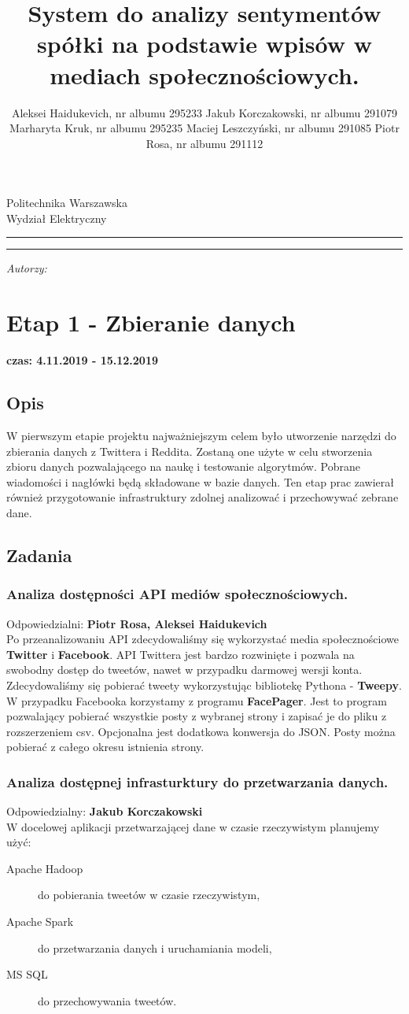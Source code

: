 \documentclass[a4paper,11pt, notitlepage ]{article}
\author{Aleksei Haidukevich, nr albumu 295233 \newline Jakub Korczakowski, nr albumu 291079 \newline Marharyta Kruk, nr albumu 295235 \newline Maciej Leszczyński, nr albumu 291085 \newline Piotr Rosa, nr albumu 291112}
\title{System do analizy sentymentów spółki na podstawie wpisów w mediach społecznościowych.}
\makeatletter
\newcommand{\linia}{\rule{\linewidth}{0.4mm}}
\renewcommand{\maketitle}{\begin{titlepage}
    \vspace*{1cm}
    \begin{center}\small
    Politechnika Warszawska\\
    Wydział Elektryczny
    \end{center}
    \vspace{3cm}
    \noindent\linia
    \begin{center}
      \LARGE \textsc{\@title}
         \end{center}
     \linia
    \vspace{0.5cm}
    \begin{flushright}
    \begin{minipage}{8cm}
    \textit{\small Autorzy:}\\
    \normalsize \textsc{\@author} \par
    \end{minipage}
    \end{flushright}
    \vspace*{\stretch{6}}
    \begin{center}
    \@date
    \end{center}
  \end{titlepage}%
}
\makeatother
\begin{document}
\maketitle
\setcounter{page}{2}
\tableofcontents
\newpage

\section{Etap 1 - Zbieranie danych}
\textbf{czas: 4.11.2019 - 15.12.2019}
\subsection{Opis} 
W pierwszym etapie projektu najważniejszym celem było utworzenie narzędzi do zbierania danych z Twittera i Reddita. Zostaną one użyte w celu stworzenia zbioru danych pozwalającego na naukę i testowanie algorytmów. Pobrane wiadomości i nagłówki będą składowane w bazie danych. Ten etap prac zawierał również przygotowanie infrastruktury zdolnej analizować i przechowywać zebrane dane.
\subsection{Zadania}
    \subsubsection{Analiza dostępności API mediów społecznościowych.}
    Odpowiedzialni: \textbf{Piotr Rosa, Aleksei Haidukevich}\\
    Po przeanalizowaniu API zdecydowaliśmy się wykorzystać media społecznościowe \textbf{Twitter} i \textbf{Facebook}. API Twittera jest bardzo rozwinięte i pozwala na swobodny dostęp do tweetów, nawet w przypadku darmowej wersji konta. Zdecydowaliśmy się pobierać tweety wykorzystując bibliotekę Pythona - \textbf{Tweepy}. W przypadku Facebooka korzystamy z programu \textbf{FacePager}. Jest to program pozwalający pobierać wszystkie posty z wybranej strony i zapisać je do pliku z rozszerzeniem csv. Opcjonalna jest dodatkowa konwersja do JSON. Posty można pobierać z całego okresu istnienia strony.
    \subsubsection{Analiza dostępnej infrasturktury do przetwarzania danych.} 
    Odpowiedzialny: \textbf{Jakub Korczakowski}\\
    W docelowej aplikacji przetwarzającej dane w czasie rzeczywistym planujemy użyć:
    \begin{description}
        \item[Apache Hadoop] do pobierania tweetów w czasie rzeczywistym,
        \item[Apache Spark] do przetwarzania danych i uruchamiania modeli,
        \item[MS SQL] do przechowywania tweetów. 
    \end{description}
\end{document}
